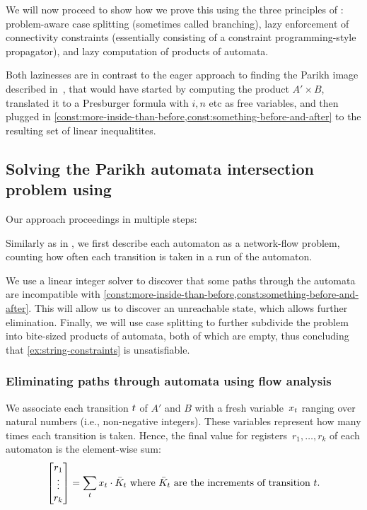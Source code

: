 We will now proceed to show how we prove this using the three principles of
\Calculus{}: problem-aware case splitting (sometimes called branching), lazy
enforcement of connectivity constraints (essentially consisting of a constraint
programming-style propagator), and lazy computation of products of automata.

Both lazinesses are in contrast to the eager approach to finding the Parikh
image described in~\cite{generate-parikh-image}, that would have started by
computing the product $A' \times B$, translated it to a Presburger formula with
$i, n$ etc as free variables, and then plugged in
\cref{const:more-inside-than-before,const:something-before-and-after} to the
resulting set of linear inequalitites.

\subsection{Solving the Parikh automata intersection problem using \Calculus{}}

Our approach proceedings in multiple steps:
\begin{inparaenum}[(i)]
\item Similarly as in \cite{generate-parikh-image}, we first describe
  each automaton as a network-flow problem, counting how often each
  transition is taken in a run of the automaton.
\item   We use a linear integer solver to discover that some
  paths through the automata are incompatible with
  \cref{const:more-inside-than-before,const:something-before-and-after}. This
  will allow us to discover an unreachable state, which allows further
  elimination. Finally, we will use case splitting to further
  subdivide the problem into bite-sized products of automata, both of
  which are empty, thus concluding that \cref{ex:string-constraints}
  is unsatisfiable.
\end{inparaenum}

\subsubsection{Eliminating paths through automata using flow analysis}\label{sec:a_1}

We associate each transition $t$ of $A'$ and $B$ with a fresh
variable~$x_t$ ranging over natural numbers (i.e.,
non-negative integers).
These variables represent how many times each
transition is taken. Hence, the final value for registers~$r_1, \ldots,
r_k$ of each automaton is the element-wise sum:
\begin{equation}\label{eq:counter-sums}
\begin{bmatrix} 
  r_1 \\
  \vdots\\
  r_k \\
\end{bmatrix} = \sum_t x_t \cdot 
  \bar{K}_t \text{ where $\bar{K}_t$ are the increments of transition $t$}.
\end{equation}

